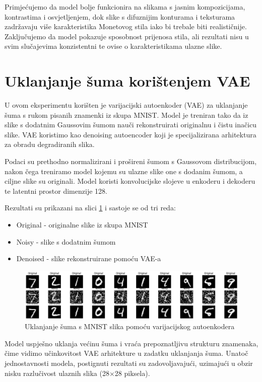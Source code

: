 \documentclass[times, utf8, seminar, numeric]{fer}
\begin{document}
	Primjećujemo da model bolje funkcionira na slikama s jasnim kompozicijama, kontrastima i osvjetljenjem, dok slike s difuznijim konturama i teksturama zadržavaju više karakteristika Monetovog stila iako bi trebale biti realističnije. Zaključujemo da model pokazuje sposobnost prijenosa stila, ali rezultati nisu u svim slučajevima konzistentni te ovise o karakteristikama ulazne slike.

	\section{Uklanjanje šuma korištenjem VAE}
		U ovom eksperimentu korišten je varijacijski autoenkoder (VAE) za uklanjanje šuma s rukom pisanih znamenki iz skupa MNIST. Model je treniran tako da iz slike s dodatnim Gaussovim šumom nauči rekonstruirati originalnu i čistu inačicu slike. VAE koristimo kao denoising autoencoder koji je specijalizirana arhitektura za obradu degradiranih slika. \cite{weng2018VAE}
		
		Podaci su prethodno normalizirani i prošireni šumom s Gaussovom distribucijom, nakon čega treniramo model kojemu su ulazne slike one s dodanim šumom, a ciljne slike su originali. Model koristi konvolucijske slojeve u enkoderu i dekoderu te latentni prostor dimenzije 128.
		
		Rezultati su prikazani na slici \ref{fig:vae_denoising} i sastoje se od tri reda:
		\begin{itemize}
			\item Original - originalne slike iz skupa MNIST
			\item Noisy - slike s dodatnim šumom
			\item Denoised - slike rekonstruirane pomoću VAE-a
		\end{itemize}
		
		\begin{figure}[H]
			\centering
			\includegraphics[width=\textwidth]{images/experiment/denoising/vae_denoising.png}
			\caption{Uklanjanje šuma s MNIST slika pomoću varijacijskog autoenkodera}
			\label{fig:vae_denoising}
		\end{figure}
		
		Model uspješno uklanja većinu šuma i vraća prepoznatljivu strukturu znamenaka, čime vidimo učinkovitost VAE arhitekture u zadatku uklanjanja šuma. Unatoč jednostavnosti modela, postignuti rezultati su zadovoljavajući, uzimajući u obzir nisku razlučivost ulaznih slika (28×28 piksela).
\end{document}
